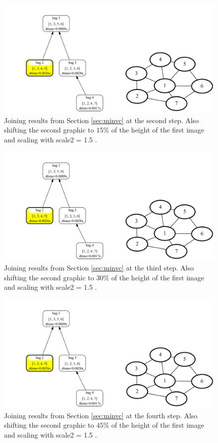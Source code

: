 \documentclass[a4paper, 12pt, bibliography=totoc]{scrartcl}
\begin{document}
\begin{figure}
	\centering
	\includegraphics[width=0.9\linewidth,height=0.9\textheight,keepaspectratio]{images/SVGJOIN/default_06sc15_rise1.pdf}
	\caption{Joining results from Section \ref{sec:minvc} at the second step. Also shifting the second graphic to $15\%$ of the height of the first image and scaling with scale2 = 1.5 .}
	\label{fig:joinscaledrise2}
\end{figure}
\begin{figure}
	\centering
	\includegraphics[width=0.9\linewidth,height=0.9\textheight,keepaspectratio]{images/SVGJOIN/default_06sc15_rise1.pdf}
	\caption{Joining results from Section \ref{sec:minvc} at the third step. Also shifting the second graphic to $30\%$ of the height of the first image and scaling with scale2 = 1.5 .}
	\label{fig:joinscaledrise3}
\end{figure}
\begin{figure}
	\centering
	\includegraphics[width=0.9\linewidth,height=0.9\textheight,keepaspectratio]{images/SVGJOIN/default_06sc15_rise1.pdf}
	\caption{Joining results from Section \ref{sec:minvc} at the fourth step. Also shifting the second graphic to $45\%$ of the height of the first image and scaling with scale2 = 1.5 .}
	\label{fig:joinscaledrise4}
\end{figure}
\end{document}

